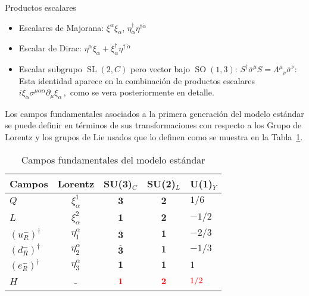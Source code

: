 \begin{frame}
Productos escalares
\begin{itemize}
\item Escalares de Majorana: $\xi^{\alpha}\xi_{\alpha}$, $\eta^{\dagger}_{ \dot{\alpha}}\eta^{\dagger \dot{\alpha}}$
\item Escalar de Dirac: $\eta^{\alpha}\xi_{\alpha}+ \xi^{\dagger}_{\dot{\alpha}}\eta^{\dagger\;\dot{\alpha  }} $


 \item Escalar subgrupo $\operatorname{SL}(2,C)$ pero vector bajo $\operatorname{SO}(1,3)$: $ S^\dagger\overline{\sigma}^\mu S={\Lambda^\mu}_\nu\overline{\sigma}^\nu$: Esta identidad aparece en la combinación de productos escalares
  $i\xi_{\dot{\alpha}} \overline{\sigma}^{\mu\dot{\alpha} \alpha} \partial_{\mu} \xi_{\alpha} \,,$
como se vera posteriormente en detalle.
\end{itemize}


\end{frame}

Los campos fundamentales asociados a la primera generación del modelo estándar se puede definir en términos de sus transformaciones con respecto a los Grupo de Lorentz y los grupos de Lie usados que lo definen como se muestra en la Tabla~\ref{tab:smflds}.

\begin{frame}
\begin{table}
  \centering
    \begin{tabular}{|l|c|c|c|l|}\hline
      Campos               &Lorentz   & SU(3)$_{C}$            & SU(2)$_{L}$           & U(1)$_Y$          \\\hline
    $Q   $                 & $\xi_{\alpha}^1$ & $\mathbf{3}$           & $\mathbf{2}$          & $1/6$          \\      
    $L   $                 & $\xi_{\alpha}^2$ & $\mathbf{1}$           & $\mathbf{2}$          & $-1/2$          \\
    $\left(u_R^{-}\right)^{\dagger}$ & $\eta_1^\alpha$  & $\overline{\mathbf{3}}$ & $\mathbf{1}$           & $-2/3$              \\
    $\left(d_R^{-}\right)^{\dagger}$ & $\eta_2^\alpha$  & $\overline{\mathbf{3}}$ & $\mathbf{1}$           & $-1/3$              \\            
    $\left(e_R^{-}\right)^{\dagger}$ & $\eta_3^\alpha$  & $\mathbf{1}$            & $\mathbf{1}$            & $1$              \\
     $H$                   & -       &  $\color{red}\mathbf{1}$ & $\color{red}\mathbf{2}$ &$\color{red}1/2$\\\hline
  \end{tabular}\hspace{1cm} 
  \caption{Campos fundamentales del modelo estándar }
  \label{tab:smflds}
\end{table}
\end{frame}



